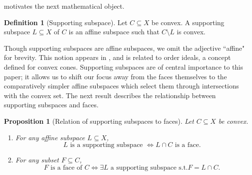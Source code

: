 \documentclass{article}
\theoremstyle{plain}
\newtheorem{proposition}{Proposition}[section]
\theoremstyle{definition}
\newtheorem{definition}{Definition}[section]
\theoremstyle{remark}
\begin{document}
motivates the next mathematical object.
\begin{definition}[Supporting subspace]
\label{loc:supporting_subspace.statement}
Let $C \subseteq X$ be convex. A supporting subspace $L \subseteq X$ of $C$ is an affine subspace such that $C \setminus L$ is convex.
\end{definition}
Though supporting subspaces are affine subspaces, we omit the
adjective ``affine" for brevity.
This notion appears in \cite[Exercise 5.4]{brondstedIntroductionConvexPolytopes1983},
and is related to order ideals, a concept defined for convex cones. 
Supporting subspaces are of central importance to this paper; it allows us to shift our focus away from the faces themselves to the
comparatively simpler affine subspaces which select them through
intersections with the convex set. The next result describes the relationship between supporting subspaces and faces.
\begin{proposition}[Relation of supporting subspaces to faces]
\label{loc:relation_of_supporting_subspaces_to_faces.statement}
Let $C \subseteq X$ be convex.
\begin{enumerate}
\item For any affine subspace $L \subseteq X$,
\begin{equation*}
L \text{ is a supporting subspace }  \iff L \cap C \text{ is a face.}
\end{equation*}
\item For any subset $F \subseteq C$,
\begin{equation*}
F \text{ is a face of }C  \iff \exists L \text{ a supporting subspace s.t.} F = L \cap C.
\end{equation*}
\end{enumerate}
\end{proposition}
\end{document}
